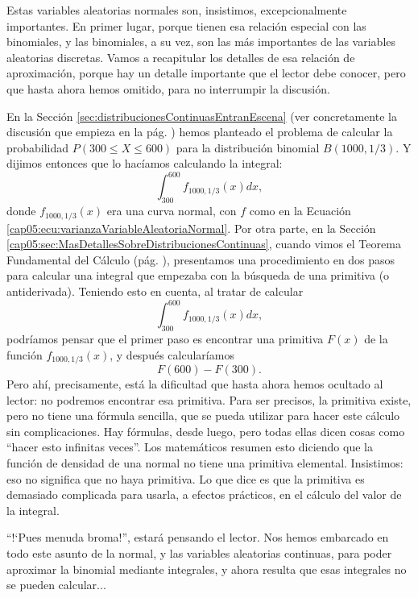 Estas variables aleatorias normales son, insistimos, excepcionalmente importantes. En primer lugar, porque tienen esa relación especial con las binomiales, y las binomiales, a su vez, son las más importantes de las variables aleatorias discretas. Vamos a recapitular los detalles de esa relación de aproximación, porque hay un detalle importante que el lector debe conocer, pero que hasta ahora hemos omitido, para no interrumpir la discusión.

En la Sección \ref{sec:distribucionesContinuasEntranEscena} (ver concretamente la discusión que empieza en la pág. \pageref{cap05:lugar:DiscusionAproximarBinomialNormal}) hemos planteado el problema de calcular la probabilidad $P(300\leq X\leq 600)$ para la distribución binomial $B(1000,1/3)$. Y dijimos entonces que lo hacíamos calculando la  integral:
\[\int_{300}^{600}f_{1000,1/3}(x)dx,\]
donde $f_{1000,1/3}(x)$ era una curva normal, con $f$ como en la Ecuación \ref{cap05:ecu:varianzaVariableAleatoriaNormal}. Por otra parte, en la Sección \ref{cap05:sec:MasDetallesSobreDistribucionesContinuas}, cuando vimos el Teorema Fundamental del Cálculo (pág. \pageref{cap05:ecu:TeoremaFundamentalCalculo}), presentamos una procedimiento en dos pasos para calcular una integral que empezaba con la búsqueda de una primitiva (o antiderivada). Teniendo esto en cuenta, al tratar de calcular
\begin{equation}
\label{cap05:ecu:IntegralNormalIntervalo}
\int_{300}^{600}f_{1000,1/3}(x)dx,
\end{equation}
podríamos pensar que el primer paso es encontrar una primitiva $F(x)$ de la función $f_{1000,1/3}(x)$, y después calcularíamos
\[F(600)-F(300).\]
Pero ahí, precisamente, está la dificultad que hasta ahora hemos ocultado al lector: no podremos encontrar esa primitiva. Para ser precisos, la primitiva existe, pero no tiene una fórmula sencilla, que se pueda utilizar para hacer este cálculo sin complicaciones. Hay fórmulas, desde luego, pero todas ellas dicen cosas como ``hacer esto infinitas veces''. Los matemáticos resumen esto diciendo que la función de densidad de una normal {\sf no tiene una primitiva elemental.} Insistimos: eso no significa que no haya primitiva. Lo que dice es que la primitiva es demasiado complicada para usarla, a efectos prácticos, en el cálculo del valor de la integral.

``{!`}Pues menuda broma!'', estará pensando el lector. Nos hemos embarcado en todo este asunto de la normal, y las variables aleatorias continuas, para poder aproximar la binomial mediante integrales, y ahora resulta que esas integrales no se pueden calcular...

